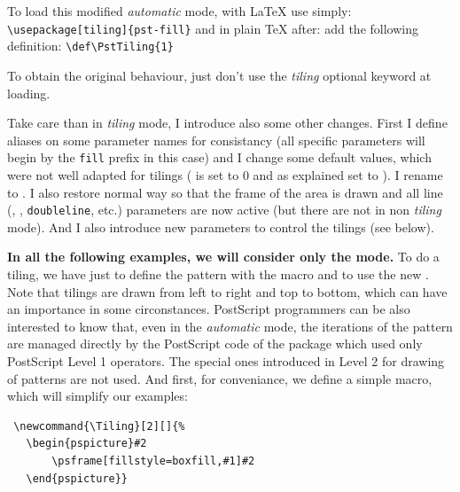 \documentclass[fontsize=11pt,english,BCOR=10mm,DIV=12,bibliography=totoc,parskip=false,
   headings=small, headinclude=false,footinclude=false,oneside]{pst-doc}
\begin{document}
 To load this modified \emph{automatic} mode, with \LaTeX{} use
simply:\newline 
\verb+\usepackage[tiling]{pst-fill}+\newline
and in plain \TeX{} after:\newline
\verb++\newline
add the following definition:\newline
\verb+\def\PstTiling{1}+

To obtain the original behaviour, just don't use the \emph{tiling} optional
keyword at loading.

Take care than in \emph{tiling} mode, I introduce also some other changes.
First I define aliases on some parameter names for consistancy (all specific
parameters will begin by the \texttt{fill} prefix in this case) and I change
some default values, which were not well adapted for tilings (
is set to 0 and as explained  set to ). I rename 
 to . I also restore normal way so that
the frame of the area is drawn and all line (,
, \texttt{doubleline}, etc.) parameters are now active (but
there are not in non \emph{tiling} mode). And I also introduce new parameters
to control the tilings (see below).

 \textbf{In all the following examples, we will consider only the
 mode.}
%
 To do a tiling, we have just to define the pattern with the
 macro and to use the new 
.
%
 Note that tilings are drawn from left to right and top to bottom, which can
have an importance in some circonstances.
%
 PostScript programmers can be also interested to know that, even in the
\emph{automatic} mode, the iterations of the pattern are managed directly by
the PostScript code of the package which used only PostScript Level 1
operators. The special ones introduced in Level 2 for drawing of patterns
\cite[section 4.9]{PostScript95} are not used.
%
 And first, for conveniance, we define a simple  macro, which
will simplify our examples:
%
\begin{verbatim}
 \newcommand{\Tiling}[2][]{%
   \begin{pspicture}#2
       \psframe[fillstyle=boxfill,#1]#2
   \end{pspicture}}
\end{verbatim}
%
\end{document}
